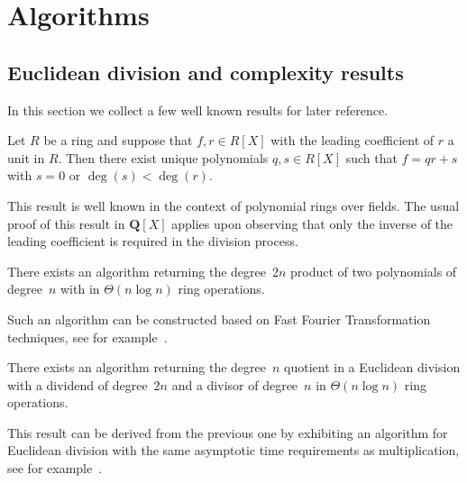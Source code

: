 
\chapter{Algorithms}


\section{Euclidean division and complexity results}
\label{sec:EuclideanDivision}

In this section we collect a few well known results for later 
reference.

\begin{prop}
Let $R$ be a ring and suppose that $f, r \in R[X]$ with the 
leading coefficient of $r$ a unit in $R$.  Then there exist 
unique polynomials $q, s \in R[X]$ such that $f = q r + s$ 
with $s = 0$ or $\deg(s) < \deg(r)$.
\end{prop}

This result is well known in the context of polynomial rings 
over fields.  The usual proof of this result in $\mathbf{Q}[X]$ 
applies upon observing that only the inverse of the leading 
coefficient is required in the division process.

\begin{prop} \label{prop:mul}
There exists an algorithm returning the degree~$2n$ product 
of two polynomials of degree~$n$ with in $\Theta(n \log n)$ 
ring operations.
\end{prop}

Such an algorithm can be constructed based on Fast Fourier Transformation 
techniques, see for example~\citep[\S 8]{GathenGerhard2003}.

\begin{prop} \label{prop:div1}
There exists an algorithm returning the degree~$n$ quotient 
in a Euclidean division with a dividend of degree~$2n$ 
and a divisor of degree~$n$ in $\Theta(n \log n)$ 
ring operations.
\end{prop}

This result can be derived from the previous one by exhibiting an algorithm 
for Euclidean division with the same asymptotic time requirements as 
multiplication, see for example~\citep[\S 11]{GathenGerhard2003}.


